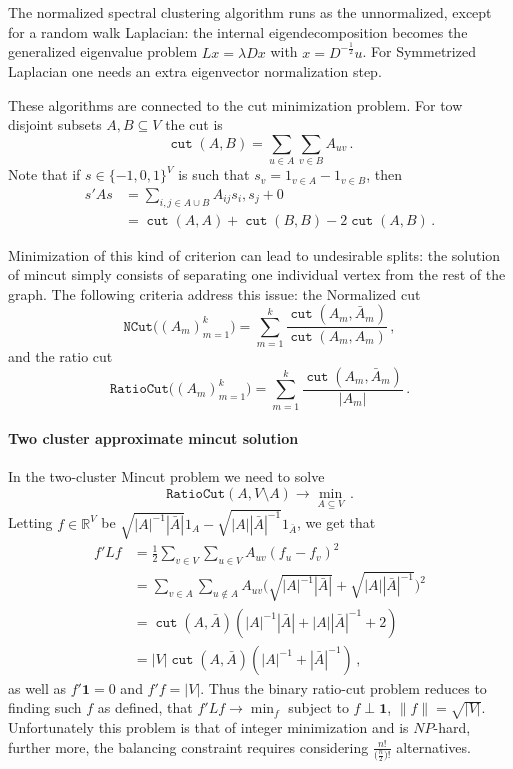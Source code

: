 \documentclass[a4paper]{article}
\newcommand{\Real}{\mathbb{R}}
\newcommand{\cut}{\mathop{\mathtt{cut}}\nolimits}
\newcommand{\one}{\mathbf{1}}
\begin{document}
The normalized spectral clustering algorithm runs as the unnormalized, except for
a random walk Laplacian: the internal eigendecomposition becomes the generalized
eigenvalue problem $L x = \lambda D x$ with $x = D^{-\frac{1}{2}} u$. For Symmetrized
Laplacian one needs an extra eigenvector normalization step.

These algorithms are connected to the cut minimization problem. For tow disjoint
subsets $A,B\subseteq V$ the cut is 
$$ \cut(A,B) = \sum_{u\in A} \sum_{v\in B} A_{uv} \,. $$
Note that if $s\in \{-1, 0,1\}^V$ is such that $s_v = 1_{v\in A} - 1_{v\in B}$, then
\begin{align*}
s' A s
    &= \sum_{i,j\in A\cup B} A_{ij} s_i, s_j + 0\\
    &= \cut(A, A) + \cut(B, B) - 2\cut(A,B) \,.
\end{align*}

Minimization of this kind of criterion can lead to undesirable splits: the solution
of mincut simply consists of separating one individual vertex from the rest of the
graph. The following criteria address this issue: the Normalized cut
$$ \mathtt{NCut}\bigl((A_m)_{m=1}^k\bigr)
    = \sum_{m=1}^k \frac{\cut(A_m,\bar{A}_m)}{\cut(A_m,A_m)}
    \,, $$
and the ratio cut
$$ \mathtt{RatioCut}\bigl((A_m)_{m=1}^k\bigr)
    = \sum_{m=1}^k \frac{\cut(A_m,\bar{A}_m)}{|A_m|}
    \,. $$

\paragraph{Two cluster approximate mincut solution} %
\label{par:two_cluster_approximate_mincut_solution}

In the two-cluster Mincut problem we need to solve
$$ \mathtt{RatioCut}(A, V\setminus A) \to \min_{A\subseteq V} \,. $$ Letting $f \in \Real^V$
be $\sqrt{|A|^{-1}|\bar{A}|} 1_A - \sqrt{|A||\bar{A}|^{-1}} 1_{\bar{A}}$, we get that
\begin{align*}
f' L f
    &= \frac{1}{2} \sum_{v\in V} \sum_{u\in V} A_{uv} (f_u - f_v)^2\\
    &= \sum_{v\in A} \sum_{u\notin A} A_{uv} \bigl(
        \sqrt{|A|^{-1}|\bar{A}|} + \sqrt{|A||\bar{A}|^{-1}}
        \bigr)^2\\
    &= \cut(A, \bar{A}) (|A|^{-1}|\bar{A}| + |A||\bar{A}|^{-1} + 2) \\
    &= |V| \cut(A, \bar{A}) (|A|^{-1} + |\bar{A}|^{-1}) \,,
\end{align*}
as well as $f'\one = 0$ and $f'f = |V|$.
Thus the binary ratio-cut problem reduces to finding such $f$ as defined, that
$f' L f \to \min_f$ subject to $f \perp \one$, $\|f\| = \sqrt{|V|}$. Unfortunately
this problem is that of integer minimization and is $NP$-hard, further more, the
balancing constraint requires considering $\frac{n!}{\big(\frac{n}{2}\big)!}$ alternatives.
\end{document}
